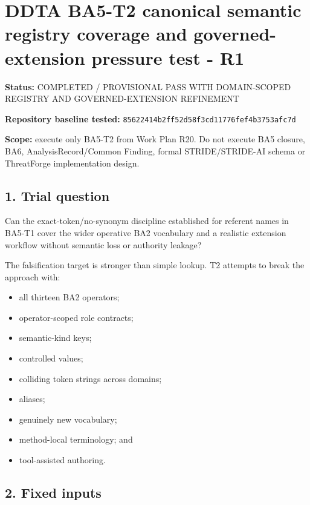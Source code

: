 \documentclass[
  10pt,
  a4paper,
]{article}
\author{}
\date{}
\providecommand{\tightlist}{%
  \setlength{\itemsep}{0pt}\setlength{\parskip}{0pt}}
\begin{document}
\section{DDTA BA5-T2 canonical semantic registry coverage and
governed-extension pressure test -
R1}\label{ddta-ba5-t2-canonical-semantic-registry-coverage-and-governed-extension-pressure-test---r1}

\textbf{Status:} COMPLETED / PROVISIONAL PASS WITH DOMAIN-SCOPED
REGISTRY AND GOVERNED-EXTENSION REFINEMENT

\textbf{Repository baseline tested:}
\texttt{85622414b2ff52d58f3cd11776fef4b3753afc7d}

\textbf{Scope:} execute only BA5-T2 from Work Plan R20. Do not execute
BA5 closure, BA6, AnalysisRecord/Common Finding, formal STRIDE/STRIDE-AI
schema or ThreatForge implementation design.

\subsection{1. Trial question}\label{trial-question}

Can the exact-token/no-synonym discipline established for referent names
in BA5-T1 cover the wider operative BA2 vocabulary and a realistic
extension workflow without semantic loss or authority leakage?

The falsification target is stronger than simple lookup. T2 attempts to
break the approach with:

\begin{itemize}
\tightlist
\item
  all thirteen BA2 operators;
\item
  operator-scoped role contracts;
\item
  semantic-kind keys;
\item
  controlled values;
\item
  colliding token strings across domains;
\item
  aliases;
\item
  genuinely new vocabulary;
\item
  method-local terminology; and
\item
  tool-assisted authoring.
\end{itemize}

\subsection{2. Fixed inputs}\label{fixed-inputs}
\end{document}
